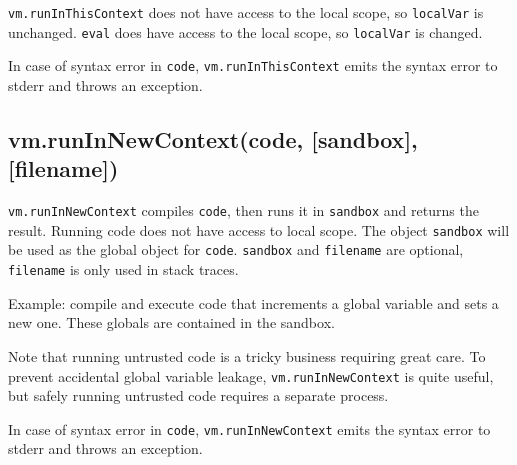 \texttt{vm.runInThisContext} does not have access to the local scope, so
\texttt{localVar} is unchanged. \texttt{eval} does have access to the
local scope, so \texttt{localVar} is changed.

In case of syntax error in \texttt{code}, \texttt{vm.runInThisContext}
emits the syntax error to stderr and throws an exception.

\subsection{vm.runInNewContext(code, {[}sandbox{]}, {[}filename{]})}

\texttt{vm.runInNewContext} compiles \texttt{code}, then runs it in
\texttt{sandbox} and returns the result. Running code does not have
access to local scope. The object \texttt{sandbox} will be used as the
global object for \texttt{code}. \texttt{sandbox} and \texttt{filename}
are optional, \texttt{filename} is only used in stack traces.

Example: compile and execute code that increments a global variable and
sets a new one. These globals are contained in the sandbox.

\begin{Shaded}
\begin{Highlighting}[]
 \NormalTok{),}
    \NormalTok{),}
      \NormalTok{: }\NormalTok{,}
      \NormalTok{: }
    \NormalTok{\};}

\NormalTok{(}\NormalTok{);}
\NormalTok{(}

\end{Highlighting}
\end{Shaded}

Note that running untrusted code is a tricky business requiring great
care. To prevent accidental global variable leakage,
\texttt{vm.runInNewContext} is quite useful, but safely running
untrusted code requires a separate process.

In case of syntax error in \texttt{code}, \texttt{vm.runInNewContext}
emits the syntax error to stderr and throws an exception.

